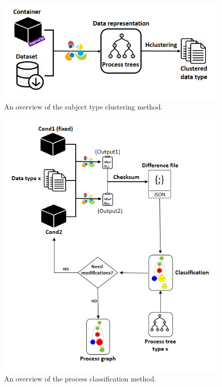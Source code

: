 \documentclass[a4paper,num-refs]{oup-contemporary}
\begin{document}
\begin{figure}
  \centering
  \includegraphics[width=.7\columnwidth]{images/Slide1}
  \caption{An overview of the subject type clustering method.}
  \label{fig:overview-cluster}
\end{figure}

\begin{figure}
  \centering
  \includegraphics[width=.75\columnwidth]{images/Slide2}
  \caption{An overview of the process classification method.}
  \label{fig:overview-classify}
\end{figure}


\end{document}
